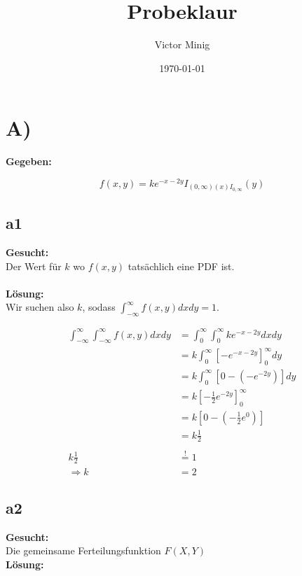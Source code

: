 \documentclass{article}
\begin{document}
\title{Probeklaur}
\author{Victor Minig}
\date{\today}
\maketitle

\section*{A)}
\textbf{Gegeben:}

\[f(x,y) = ke^{-x-2y}I_{(0,\infty)(x)I_{0, \infty}}(y)\]
\subsection*{a1}
\textbf{Gesucht:}\\

Der Wert für $k$ wo $f(x,y)$ tatsächlich eine PDF ist.\\\\
\textbf{Lösung:} \\

Wir suchen also $k$, sodass $\int_{-\infty}^{\infty} f(x,y) dx dy= 1$.

\begin{align*}
    \int_{-\infty}^{\infty} \int_{-\infty}^{\infty} f(x,y) dx dy &= \int_{0}^{\infty} \int_{0}^{\infty} ke^{-x-2y} dx dy \\
    &= k \int_{0}^{\infty} \left[-e^{-x-2y}\right]_0^{\infty} dy \\
    &= k \int_{0}^{\infty} \left[0 - (-e^{-2y}) \right] dy \\
    &= k \left[-\frac{1}{2}e^{-2y}\right]_0^{\infty} \\
    &= k \left[0- (-\frac{1}{2}e^{0})\right] \\
    &= k\frac{1}{2} \\ \\
    k \frac{1}{2} &\overset{!}{=} 1 \\
    \Rightarrow k &= 2  
\end{align*}

\subsection*{a2}
\textbf{Gesucht:} \\ 

Die gemeinsame Ferteilungsfunktion $F(X, Y)$\\
\textbf{Lösung:} \\
\end{document}
